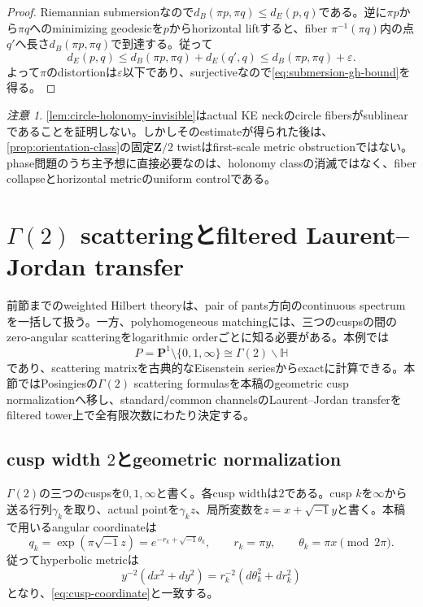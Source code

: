 \documentclass[11pt,a4paper]{ltjsarticle}
\theoremstyle{definition}
\theoremstyle{remark}
\newtheorem{remark}[theorem]{注意}
\newcommand{\PP}{\mathbf P}
\newcommand{\ZZ}{\mathbf Z}
\newcommand{\eps}{\varepsilon}
\begin{document}
\begin{proof}
Riemannian submersionなので$d_B(\pi p,\pi q)\le d_E(p,q)$である。逆に$\pi p$から$\pi q$へのminimizing geodesicを$p$からhorizontal liftすると、fiber $\pi^{-1}(\pi q)$内の点$q'$へ長さ$d_B(\pi p,\pi q)$で到達する。従って
\[
 d_E(p,q)\le d_B(\pi p,\pi q)+d_E(q',q)
 \le d_B(\pi p,\pi q)+\eps.
\]
よって$\pi$のdistortionは$\eps$以下であり、surjectiveなので\eqref{eq:submersion-gh-bound}を得る。
\end{proof}

\begin{remark}
\cref{lem:circle-holonomy-invisible}はactual KE neckのcircle fibersがsublinearであることを証明しない。しかしそのestimateが得られた後は、\cref{prop:orientation-class}の固定$\ZZ/2$ twistはfirst-scale metric obstructionではない。phase問題のうち主予想に直接必要なのは、holonomy classの消滅ではなく、fiber collapseとhorizontal metricのuniform controlである。
\end{remark}


\section{$\Gamma(2)$ scatteringとfiltered Laurent--Jordan transfer}
\label{sec:gamma2-scattering}

前節までのweighted Hilbert theoryは、pair of pants方向のcontinuous spectrumを一括して扱う。一方、polyhomogeneous matchingには、三つのcuspsの間のzero-angular scatteringをlogarithmic orderごとに知る必要がある。本例では
\[
 P=\PP^1\setminus\{0,1,\infty\}
 \cong \Gamma(2)\backslash\mathbb H
\]
であり、scattering matrixを古典的なEisenstein seriesからexactに計算できる。本節ではPosingiesの$\Gamma(2)$ scattering formulas\cite{Posingies}を本稿のgeometric cusp normalizationへ移し、standard/common channelsのLaurent--Jordan transferをfiltered tower上で全有限次数にわたり決定する。

\subsection{cusp width $2$とgeometric normalization}

$\Gamma(2)$の三つのcuspsを$0,1,\infty$と書く。各cusp widthは$2$である。cusp $k$を$\infty$から送る行列$\gamma_k$を取り、actual pointを$\gamma_k z$、局所変数を$z=x+\sqrt{-1}y$と書く。本稿で用いるangular coordinateは
\begin{equation}\label{eq:gamma2-cusp-coordinate}
 q_k=\exp(\pi\sqrt{-1}z)
     =e^{-r_k+\sqrt{-1}\theta_k},
 \qquad
 r_k=\pi y,
 \qquad
 \theta_k=\pi x\pmod{2\pi}.
\end{equation}
従ってhyperbolic metricは
\[
 y^{-2}(dx^2+dy^2)
 =r_k^{-2}(d\theta_k^2+dr_k^2)
\]
となり、\cref{eq:cusp-coordinate}と一致する。
\end{document}
